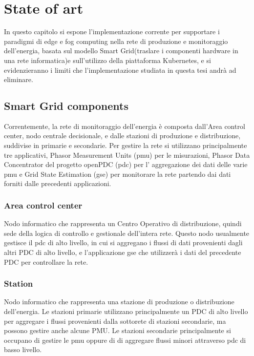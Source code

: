 \chapter{State of art}
In questo capitolo si espone l'implementazione corrente per supportare i paradigmi di edge e fog computing nella rete di produzione e monitoraggio dell'energia, basata sul modello Smart Grid(traslare i componenti hardware in una rete informatica)e sull'utilizzo della piattaforma Kubernetes, e si evidenzieranno i limiti che l'implementazione studiata in questa tesi andrà ad eliminare.

\section{Smart Grid components}
Correntemente, la rete di monitoraggio dell'energia è composta dall'Area control center, nodo centrale decisionale, e dalle stazioni di produzione e distribuzione, suddivise in primarie e secondarie. Per gestire la rete si utilizzano principalmente tre applicativi, Phasor Measurement Units (pmu) per le misurazioni, Phasor Data Concentrator del progetto openPDC (pdc) per l' aggregazione dei dati delle varie pmu e Grid State Estimation (gse) per monitorare la rete partendo dai dati forniti dalle precedenti applicazioni.

\subsection{Area control center}
Nodo informatico che rappresenta un Centro Operativo di distribuzione, quindi sede della logica di controllo e gestionale dell'intera rete. Questo nodo usualmente gestisce il pdc di alto livello, in cui si aggregano i flussi di dati provenienti dagli altri PDC di alto livello, e l'applicazione gse che utilizzerà i dati del precedente PDC per controllare la rete.

\subsection{Station}
Nodo informatico che rappresenta una stazione di produzione o distribuzione dell'energia. Le stazioni primarie utilizzano principalmente un PDC di alto livello per aggregare i flussi provenienti dalla sottorete di stazioni secondarie, ma possono gestire anche alcune PMU. Le stazioni secondarie principalmente si occupano di gestire le pmu oppure di di aggregare flussi minori attraverso pdc di basso livello. 


